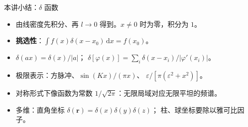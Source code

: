 \documentclass[fontset=windows, chinese, 10pt, xcolor=dvipsnames]{beamer}
\begin{document}
\begin{frame}{本讲小结：$\delta$ 函数}
  \begin{itemize}
    \item 由线密度先积分、再 $l\to 0$ 得到。$x\neq 0$ 时为零，积分为 $1$。
    \item \textbf{挑选性}：$\displaystyle\int f(x)\delta(x-x_0)\,\mathrm{d}x=f(x_0)$。
    \item $\delta(ax)=\delta(x)/|a|$；
      $\displaystyle\delta[\varphi(x)]
      =\sum_i\delta(x-x_i)/|\varphi'(x_i)|$。
    \item 极限表示：方脉冲、$\sin(Kx)/(\pi x)$、
      $\varepsilon/[\pi(\varepsilon^2+x^2)]$。
    \item 对称形式下像函数为常数 $1/\sqrt{2\pi}$：无限局域对应无限平坦的频谱。
    \item 多维：直角坐标 $\delta(\mathbf{r})=\delta(x)\delta(y)\delta(z)$；
      柱、球坐标要除以雅可比因子。
  \end{itemize}
\end{frame}

\end{document}
